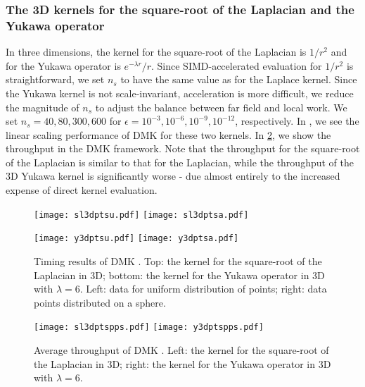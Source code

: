 \documentclass[final,letterpaper]{siamart171218}
\newcommand{\acron}{DMK }
\begin{document}
\subsubsection{The 3D kernels for the square-root of the Laplacian and the Yukawa operator}

In three dimensions,
the kernel for the square-root of the Laplacian is $1/r^2$ and for the Yukawa operator
is $e^{-\lambda r}/r$. 
Since SIMD-accelerated evaluation for $1/r^2$ is straightforward, we set
$n_s$ to have the same value as for the 
Laplace kernel. Since the Yukawa kernel is not scale-invariant,
acceleration is more difficult, we reduce the magnitude of $n_s$ to adjust the 
balance between far field and local work. 
We set $n_s = 40, 80, 300, 600$ for $\epsilon = 10^{-3}, 10^{-6}, 10^{-9}, 10^{-12}$, 
respectively. In , we see the linear scaling performance 
of \acron for these two kernels. In \cref{sly3dthroughput}, we show the throughput
in the \acron framework. Note that the throughput for the square-root
of the Laplacian is similar to that for the Laplacian, while the throughput
of the 3D Yukawa kernel is significantly worse -  due almost entirely to the increased
expense of direct kernel evaluation.

\begin{figure}[!ht]
\centering
\texttt{[image: sl3dptsu.pdf]}
\hspace{0.4in}
\texttt{[image: sl3dptsa.pdf]}

\vspace{5mm}

\texttt{[image: y3dptsu.pdf]}
\hspace{0.4in}
\texttt{[image: y3dptsa.pdf]}
\caption{\sf Timing results of \acron. Top: the kernel for
  the square-root of the Laplacian in 3D; bottom: the kernel for the Yukawa operator in 3D
  with $\lambda=6$. Left: data for uniform distribution of points; 
  right: data points distributed on a sphere.}
\label{sly3dtimingresults}
\end{figure}


\begin{figure}[!ht]
\centering
\texttt{[image: sl3dptspps.pdf]}
\hspace{0.4in}
\texttt{[image: y3dptspps.pdf]}
\caption{\sf Average throughput of \acron. Left: the kernel for
  the square-root of the Laplacian in 3D; right: the kernel for the Yukawa operator in 3D 
  with $\lambda=6$.} 
\label{sly3dthroughput}
\end{figure}
\end{document}
